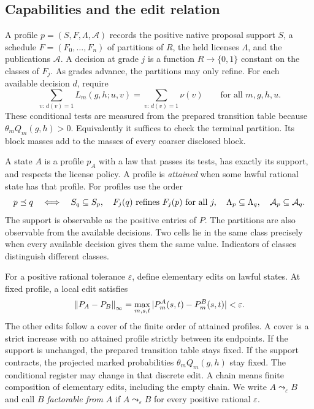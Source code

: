 \subsection{Capabilities and the edit relation}\label{sec:capabilities}

A profile \(p=(S,F,\Lambda,\mathcal A)\) records the positive native
proposal support \(S\), a schedule \(F=(F_0,\ldots,F_n)\) of partitions
of \(R\), the held licenses \(\Lambda\), and the publications \(\mathcal A\).
A decision at grade \(j\) is a function \(R\to\{0,1\}\) constant on the
classes of \(F_j\). As grades advance, the partitions may only refine.
For each available decision \(d\), require
\begin{equation}\label{eq:decision-mass}
 \sum_{v:\,d(v)=1} L_m(g,h;u,v)=\sum_{v:\,d(v)=1}\nu(v)
 \qquad\text{for all }m,g,h,u .
\end{equation}
These conditional tests are measured from the prepared transition table
because \(\theta_m Q_m(g,h)>0\). Equivalently it suffices to check
the terminal partition. Its block masses add to the masses of every
coarser disclosed block.

A state \(A\) is a profile \(p_A\) with a law that passes its tests,
has exactly its support, and respects the license policy. A profile is
\emph{attained} when some lawful rational state has that profile.
For profiles use the order
\begin{equation}\label{eq:profile-order}
 p\preceq q\quad\Longleftrightarrow\quad
 S_q\subseteq S_p,\quad
 F_j(q)\text{ refines }F_j(p)\text{ for all }j,\quad
 \Lambda_p\subseteq\Lambda_q,\quad \mathcal A_p\subseteq\mathcal A_q .
\end{equation}
The support is observable as the positive entries of \(P\). The
partitions are also observable from the available decisions.
Two cells lie in the same class precisely when every available
decision gives them the same value. Indicators of classes distinguish
different classes.

For a positive rational tolerance \(\varepsilon\), define elementary
edits on lawful states. At fixed profile,
a local edit satisfies
\[
 \left\lVert P_A-P_B \right\rVert_\infty
 =\max_{m,s,t}|P^A_m(s,t)-P^B_m(s,t)|<\varepsilon .
\]
The other edits follow a cover of the finite order of attained profiles.
A cover is a strict increase with no attained profile strictly between
its endpoints. If the support is unchanged, the prepared transition
table stays fixed. If the support contracts, the projected marked
probabilities \(\theta_m Q_m(g,h)\) stay fixed. The conditional register may
change in that discrete edit. A chain means finite composition of
elementary edits, including the empty chain. We write \(A\leadsto_\varepsilon B\)
and call \(B\) \emph{factorable from \(A\)} if \(A\leadsto_\varepsilon B\)
for every positive rational \(\varepsilon\).


